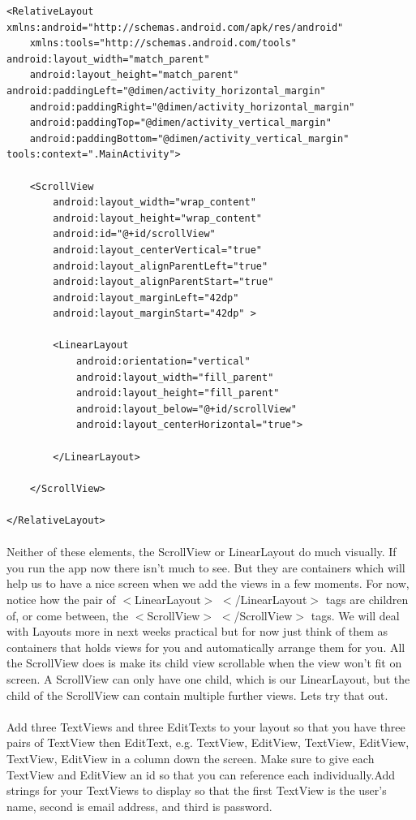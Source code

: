 \begin{lstlisting}
<RelativeLayout xmlns:android="http://schemas.android.com/apk/res/android"
    xmlns:tools="http://schemas.android.com/tools" android:layout_width="match_parent"
    android:layout_height="match_parent" android:paddingLeft="@dimen/activity_horizontal_margin"
    android:paddingRight="@dimen/activity_horizontal_margin"
    android:paddingTop="@dimen/activity_vertical_margin"
    android:paddingBottom="@dimen/activity_vertical_margin" tools:context=".MainActivity">

    <ScrollView
        android:layout_width="wrap_content"
        android:layout_height="wrap_content"
        android:id="@+id/scrollView"
        android:layout_centerVertical="true"
        android:layout_alignParentLeft="true"
        android:layout_alignParentStart="true"
        android:layout_marginLeft="42dp"
        android:layout_marginStart="42dp" >

        <LinearLayout
            android:orientation="vertical"
            android:layout_width="fill_parent"
            android:layout_height="fill_parent"
            android:layout_below="@+id/scrollView"
            android:layout_centerHorizontal="true">

        </LinearLayout>

    </ScrollView>

</RelativeLayout>
\end{lstlisting}

\paragraph{} Neither of these elements, the ScrollView or LinearLayout do much visually. If you run the app now there isn't much to see. But they are containers which will help us to have a nice screen when we add the views in a few moments. For now, notice how the pair of $<$LinearLayout$>$ $<$/LinearLayout$>$ tags are children of, or come between, the $<$ScrollView$>$ $<$/ScrollView$>$ tags. We will deal with Layouts more in next weeks practical but for now just think of them as containers that holds views for you and automatically arrange them for you. All the ScrollView does is make its child view scrollable when the view won't fit on screen. A ScrollView can only have one child, which is our LinearLayout, but the child of the ScrollView can contain multiple further views. Lets try that out.

\paragraph{} Add three TextViews and three EditTexts to your layout so that you have three pairs of TextView then EditText, e.g. TextView, EditView, TextView, EditView, TextView, EditView in a column down the screen. Make sure to give each TextView and EditView an id so that you can reference each individually.Add strings for your TextViews to display so that the first TextView is the user's name, second is email address, and third is password.


